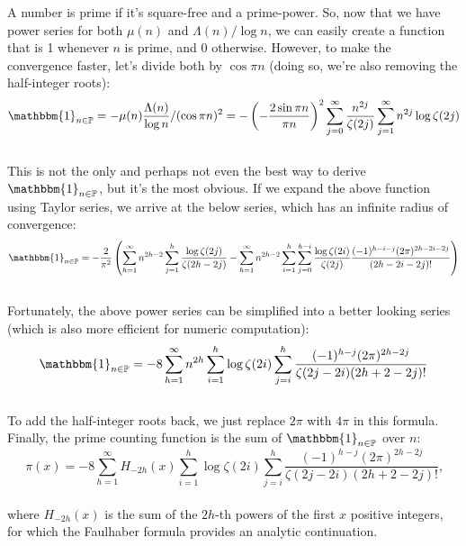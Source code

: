 \documentclass[12pt]{article}
\begin{document}
A number is prime if it's square-free and a prime-power. So, now that we have power series for both $\mu(n)$ and $\Lambda(n)/\log{n}$, we can easily create a function that is 1 whenever $n$ is prime, and 0 otherwise. However, to make the convergence faster, let's divide both by $\cos{\pi n}$ (doing so, we're also removing the half-integer roots):
\begin{equation} \nonumber
\mathbbm{1}_{n\in \mathbb{P}}=-\mu(n)\frac{\Lambda(n)}{\log{n}}/(\cos{\pi n})^2=-\left(-\frac{2\sin{\pi n}}{\pi n}\right)^2\sum_{j=0}^{\infty}\frac{n^{2j}}{\zeta(2j)}\sum_{j=1}^{\infty} n^{2j}\log{\zeta(2j)}
\end{equation}\\
\indent This is not the only and perhaps not even the best way to derive $\mathbbm{1}_{n\in \mathbb{P}}$, but it's the most obvious. If we expand the above function using Taylor series, we arrive at the below series, which has an infinite radius of convergence:
\begin{equation} \nonumber
\mathbbm{1}_{n\in \mathbb{P}}=-\frac{2}{\pi ^2}\left(\sum _{h=1}^{\infty } n^{2h-2}\sum _{j=1}^h \frac{\log\zeta(2j)}{\zeta(2h-2j)}-
\sum _{h=1}^{\infty} n^{2h-2}\sum _{i=1}^h \sum _{j=0}^{h-i} \frac{\log\zeta(2i)}{\zeta(2j)}\frac{(-1)^{h-i-j}(2\pi )^{2h-2i-2j}}{(2h-2i-2j)!}\right)
\end{equation}\\
\indent Fortunately, the above power series can be simplified into a better looking series (which is also more efficient for numeric computation):
\begin{equation} \nonumber
\mathbbm{1}_{n\in \mathbb{P}}=-8\sum _{h=1}^{\infty} n^{2h}\sum _{i=1}^h \log\zeta(2i)\sum _{j=i}^{h}\frac{(-1)^{h-j}(2\pi )^{2h-2j}}{\zeta(2j-2i)(2h+2-2j)!}
\end{equation}\\
\indent To add the half-integer roots back, we just replace $2\pi$ with $4\pi$ in this formula. Finally, the prime counting function is the sum of $\mathbbm{1}_{n\in \mathbb{P}}$ over $n$:
\begin{equation} \nonumber
\pi(x)=-8\sum _{h=1}^{\infty} H_{-2h}(x)\sum _{i=1}^h \log\zeta(2i)\sum _{j=i}^{h}\frac{(-1)^{h-j}(2\pi )^{2h-2j}}{\zeta(2j-2i)(2h+2-2j)!} \text{,}
\end{equation}\\
\noindent where $H_{-2h}(x)$ is the sum of the $2h$-th powers of the first $x$ positive integers, for which the Faulhaber formula provides an analytic continuation.
\end{document}
